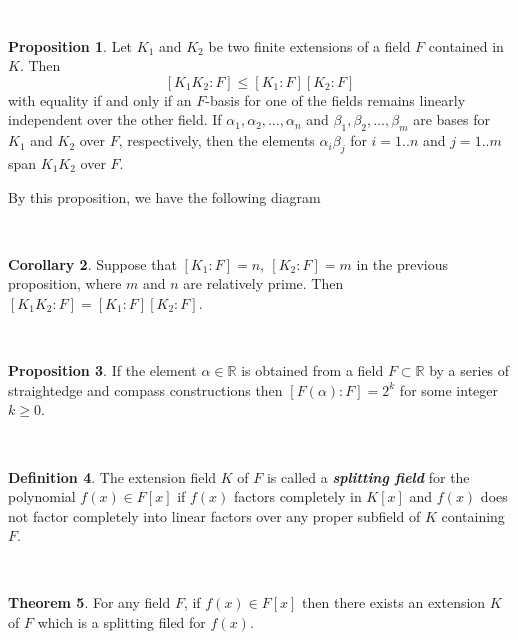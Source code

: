 \documentclass{article}
\theoremstyle{definition}
\newtheorem{thm}{Theorem}[section]
\newtheorem{prop}[thm]{Proposition}
\newtheorem{cor}[thm]{Corollary}
\newtheorem{defn}[thm]{Definition}
\newcommand{\nl}{\textcolor{white}{nothing}}
\newcommand{\R}{\mathbb{R}}
\newcommand{\al}{\alpha}
\newcommand{\be}{\beta}
\begin{document}
\nl

\begin{prop}
Let $K_1$ and $K_2$ be two finite extensions of a field $F$ contained in $K$. Then
\[[K_1K_2:F]\leq[K_1:F][K_2:F]\]
with equality if and only if an $F$-basis for one of the fields remains linearly independent over the other field. If $\al_1,\al_2,\ldots,\al_n$ and $\be_1,\be_2,\ldots,\be_m$ are bases for $K_1$ and $K_2$ over $F$, respectively, then the elements $\al_i\be_j$ for $i = 1..n$ and $j = 1..m$ span $K_1K_2$ over $F$.
\end{prop}

By this proposition, we have the following diagram

\begin{center}
\end{center}

\nl

\begin{cor}
Suppose that $[K_1:F] = n,\ [K_2: F] = m$ in the previous proposition, where $m$ and $n$ are relatively prime. Then $[K_1K_2 : F] = [K_1:F][K_2:F]$.
\end{cor}

\nl

\begin{prop}
If the element $\al\in \R$ is obtained from a field $F\subset \R$ by a series of straightedge and compass constructions then $[F(\al) : F] = 2^k$ for some integer $k\geq 0$.
\end{prop}

\nl

\begin{defn}
The extension field $K$ of $F$ is called a \textit{\textbf{splitting field}} for the polynomial $f(x)\in F[x]$ if $f(x)$ factors completely in $K[x]$ and $f(x)$ does not factor completely into linear factors over any proper subfield of $K$ containing $F$.
\end{defn}

\nl

\begin{thm}
For any field $F$, if $f(x)\in F[x]$ then there exists an extension $K$ of $F$ which is a splitting filed for $f(x)$.
\end{thm}
\end{document}
